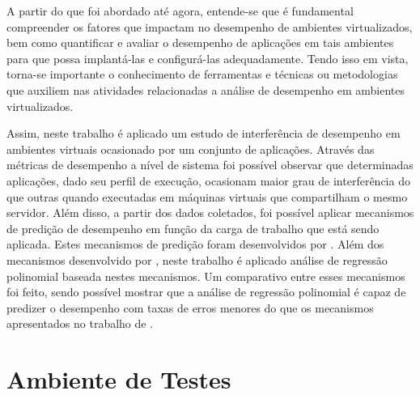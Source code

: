 \documentclass[[10pt,journal]{IEEEtran}
\begin{document}
A partir do que foi abordado até agora, entende-se que é fundamental compreender os fatores que impactam no desempenho de ambientes virtualizados, bem como quantificar e avaliar o desempenho de aplicações em tais ambientes para que possa implantá-las e configurá-las adequadamente. Tendo isso em vista, torna-se importante o conhecimento de ferramentas e técnicas ou metodologias que auxiliem nas atividades relacionadas a análise de desempenho em ambientes virtualizados. 

Assim, neste trabalho é aplicado um estudo de interferência de desempenho em ambientes virtuais ocasionado por um conjunto de aplicações. Através das métricas de desempenho a nível de sistema foi possível observar que determinadas aplicações, dado seu perfil de execução, ocasionam maior grau de interferência do que outras quando executadas em máquinas virtuais que compartilham o mesmo servidor. Além disso, a partir dos dados coletados, foi possível aplicar mecanismos de predição de desempenho em função da carga de trabalho que está sendo aplicada. Estes mecanismos de predição foram desenvolvidos por \cite{koh2007}. Além dos mecanismos desenvolvido por \cite{koh2007}, neste trabalho é aplicado análise de regressão polinomial baseada nestes mecanismos. Um comparativo entre esses mecanismos foi feito, sendo possível mostrar que a análise de regressão polinomial é capaz de predizer o desempenho com taxas de erros menores do que os mecanismos apresentados no trabalho de \cite{koh2007}. 
 


\section{Ambiente de Testes}\label{sec:ambiente_teste}
\end{document}
